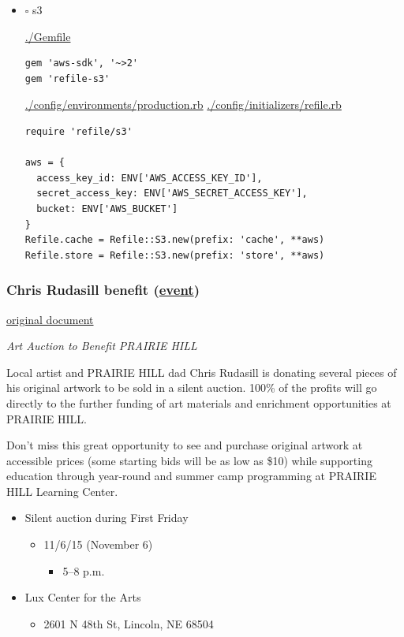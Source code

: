 \documentclass[11pt]{article}
\begin{document}
\begin{itemize}
\begin{itemize}
\begin{itemize}
\item $\square$ s3

\url{./Gemfile}

\begin{verbatim}
gem 'aws-sdk', '~>2'
gem 'refile-s3'
\end{verbatim}

\url{./config/environments/production.rb}
\url{./config/initializers/refile.rb}

\begin{verbatim}
require 'refile/s3'

aws = {
  access_key_id: ENV['AWS_ACCESS_KEY_ID'],
  secret_access_key: ENV['AWS_SECRET_ACCESS_KEY'],
  bucket: ENV['AWS_BUCKET']
}
Refile.cache = Refile::S3.new(prefix: 'cache', **aws)
Refile.store = Refile::S3.new(prefix: 'store', **aws)
\end{verbatim}
\end{itemize}
\end{itemize}
\end{itemize}


\subsubsection*{Chris Rudasill benefit (\hyperref[sec-1-3]{event})}
\label{sec-1-3-1}

\href{docs/ArtAuctionbyChrisRudasilltobenifittPrairieHill.docx.txt}{original document}

\emph{Art Auction to Benefit PRAIRIE HILL}

Local artist and PRAIRIE HILL dad Chris Rudasill is donating 
several pieces of his original artwork to be sold in a silent 
auction. 100\% of the profits will go directly to the further 
funding of art materials and enrichment opportunities at PRAIRIE  
HILL. 

Don’t miss this great opportunity to see and purchase original artwork 
at accessible prices (some starting bids will be as low as \$10) while 
supporting education through year-round and summer camp programming at 
PRAIRIE HILL Learning Center.


\begin{itemize}
\item Silent auction during First Friday 
\begin{itemize}
\item 11/6/15 (November 6)
\begin{itemize}
\item 5–8 p.m.
\end{itemize}
\end{itemize}
\item Lux Center for the Arts 
\begin{itemize}
\item 2601 N 48th St, Lincoln, NE 68504
\end{itemize}
\end{itemize}
\end{document}
